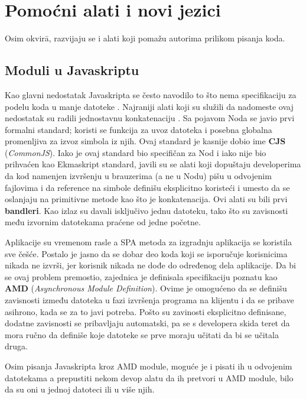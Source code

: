 \section{Pomoćni alati i novi jezici}

Osim okvir\=a, razvijaju se i alati koji pomažu autorima prilikom pisanja koda.

\subsection{Moduli u Javaskriptu}
\label{subsec:js-moduli}

Kao glavni nedostatak Javaskripta se često navodilo to što nema specifikaciju za podelu koda u manje datoteke \cite[\S10]{eloquent-js}.
Najraniji alati koji su služili da nadomeste ovaj nedostatak su radili jednostavnu konkatenaciju \cite{ancienct-concat}.
Sa pojavom Noda se javio prvi formalni standard; koristi se funkcija  za uvoz datoteka i posebna globalna promenljiva  za izvoz simbola iz njih.
Ovaj standard je kasnije dobio ime \textbf{CJS} (\textsl{CommonJS}).
Iako je ovaj standard bio specifičan za Nod i iako nije bio prihvaćen kao Ekmaskript standard, javili su se alati koji dopuštaju developerima da kod namenjen izvršenju u brauzerima (a ne u Nodu) pišu u odvojenim fajlovima i da reference na simbole definišu eksplicitno koristeći  i  umesto da se oslanjaju na primitivne metode kao što je konkatenacija.
Ovi alati su bili prvi \textbf{bandleri}.
Kao izlaz su davali isključivo jednu  datoteku, tako što su zavisnosti među izvornim datotekama praćene od jedne početne.

Aplikacije su vremenom rasle a SPA metoda za izgradnju aplikacija se koristila sve češće.
Postalo je jasno da se dobar deo koda koji se isporučuje korisnicima nikada ne izvrši, jer korisnik nikada ne dođe do određenog dela aplikacije.
Da bi se ovaj problem premostio, zajednica je definisala specifikaciju poznatu kao \textbf{AMD} (\textsl{Asynchronous Module Definition}).
Ovime je omogućeno da se definišu zavisnosti između datoteka u fazi izvršenja programa na klijentu i da se pribave asihrono, kada se za to javi potreba.
Pošto su zavinosti eksplicitno definisane, dodatne zavisnosti se pribavljaju automatski, pa se s developera skida teret da mora ručno da definiše koje datoteke se prve moraju učitati da bi se učitala druga.

Osim pisanja Javaskripta kroz AMD module, moguće je i pisati ih u odvojenim datotekama a prepustiti nekom devop alatu da ih pretvori u AMD module, bilo da su oni u jednoj datoteci ili u više njih.

